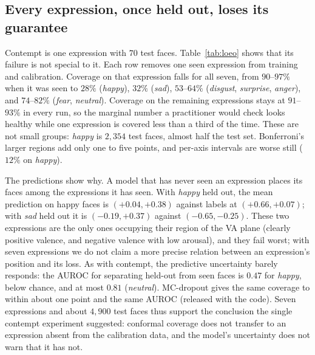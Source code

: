 \subsection{Every expression, once held out, loses its guarantee}
\label{sec:loeo}
Contempt is one expression with $70$ test faces. Table~\ref{tab:loeo} shows that
its failure is not special to it. Each row removes one seen expression from
training and calibration. Coverage on that expression falls for all seven, from
$90$--$97\%$ when it was seen to $28\%$ (\emph{happy}), $32\%$
(\emph{sad}), $53$--$64\%$ (\emph{disgust}, \emph{surprise},
\emph{anger}), and $74$--$82\%$ (\emph{fear}, \emph{neutral}). Coverage on
the remaining expressions stays at $91$--$93\%$ in every run, so the
marginal number a practitioner would check looks healthy while one expression
is covered less than a third of the time. These are not small groups: \emph{happy} is
$2{,}354$ test faces, almost half the test set. Bonferroni's larger regions add
only one to five points, and per-axis intervals are worse still
($12\%$ on \emph{happy}).

The predictions show why. A model that has never seen an expression places its
faces among the expressions it has seen. With \emph{happy} held out, the mean
prediction on happy faces is $(+0.04,+0.38)$ against labels at
$(+0.66,+0.07)$; with \emph{sad} held out it is $(-0.19,+0.37)$
against $(-0.65,-0.25)$. These two expressions are the only ones occupying
their region of the VA plane (clearly positive valence, and negative valence with
low arousal), and they fail worst; with seven expressions we do not claim a
more precise relation between an expression's position and its loss. As with
contempt, the
predictive uncertainty barely responds: the AUROC for separating held-out from
seen faces is $0.47$ for \emph{happy}, below chance, and at most
$0.81$ (\emph{neutral}). MC-dropout gives the same coverage to within
about one point and the same AUROC (released with the code).
Seven expressions and about $4{,}900$ test faces thus support the conclusion the
single contempt experiment suggested: conformal coverage does not transfer to an
expression absent from the calibration data, and the model's uncertainty does
not warn that it has not.

\begin{table}[h]
  \centering\small
  
  \caption{Holding out one expression from training and calibration (evidential
  head, nominal $90\%$, coverage in \%). In training: max-score joint coverage
  on the same test faces in the main runs, where the expression was seen.
  Per-axis, Bonferroni, Max-score: joint coverage on the held-out expression.
  Others: max-score coverage on the remaining seen expressions. AUROC: total
  predictive standard deviation, held-out versus seen faces (0.5 = chance).
  Mean$\pm$std over three seeds; AUROC is the mean.}
  \label{tab:loeo}
\end{table}

